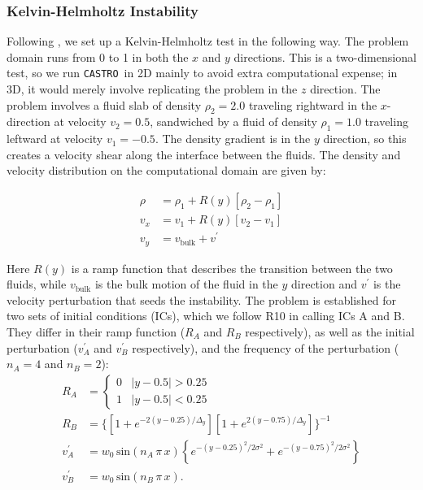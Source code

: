 \documentclass[iop,numberedappendix]{../emulateapj}
\newcommand{\castro}{\texttt{CASTRO}}
\begin{document}
\subsubsection{Kelvin-Helmholtz Instability}\label{sec:khi}

Following \cite{robertson:2010}, we set up a Kelvin-Helmholtz test in
the following way. The problem domain runs from 0 to 1 in both the $x$
and $y$ directions. This is a two-dimensional test, so we run
\castro\ in 2D mainly to avoid extra computational expense; in 3D, it 
would merely involve replicating the problem in the $z$ direction.
The problem involves a fluid slab of density $\rho_2 = 2.0$ traveling rightward in the
$x$-direction at velocity $v_2 = 0.5$, sandwiched by a fluid of
density $\rho_1 = 1.0$ traveling leftward at velocity $v_1 =
-0.5$. The density gradient is in the $y$ direction, so this creates a
velocity shear along the interface between the fluids. The density and
velocity distribution on the computational domain are given by:

\begin{align}
  \rho &= \rho_1 + R(y)\left[\rho_2 - \rho_1\right] \\
  v_x  &= v_1 + R(y)\left[v_2 - v_1\right] \\
  v_y  &= v_{\text{bulk}} + v^\prime
\end{align}

Here $R(y)$ is a ramp function that describes the transition between
the two fluids, while $v_{\text{bulk}}$ is the bulk motion of the
fluid in the $y$ direction and $v^\prime$ is the velocity perturbation
that seeds the instability. The problem is established for two
sets of initial conditions (ICs), which we follow
R10 in calling ICs A and B. They differ in
their ramp function ($R_A$ and $R_B$ respectively), as well as the
initial perturbation ($v^\prime_A$ and $v^\prime_B$ respectively), and
the frequency of the perturbation ($n_A = 4$ and $n_B = 2$):
\begin{align}
  R_A &= \begin{cases} 0 & |y - 0.5| > 0.25 \\ 1 & |y - 0.5| < 0.25 \end{cases} \label{eq:kh_ic_a_ramp}\\
  R_B &= \Big\{\left[1 + e^{-2(y-0.25)/\Delta_y}\right]\left[1 + e^{2(y-0.75)/\Delta_y}\right]\Big\}^{-1} \label{eq:kh_ic_b_ramp}\\
  v^\prime_A &= w_0\, \text{sin}\left(n_A\, \pi\, x\right) \left\{e^{-(y-0.25)^2 / 2\sigma^2} + e^{-(y-0.75)^2/2\sigma^2}\right\} \label{eq:kh_ic_a}\\
  v^\prime_B &= w_0\, \text{sin}\left(n_B\, \pi\, x\right). \label{eq:kh_ic_b}
\end{align}
\end{document}
